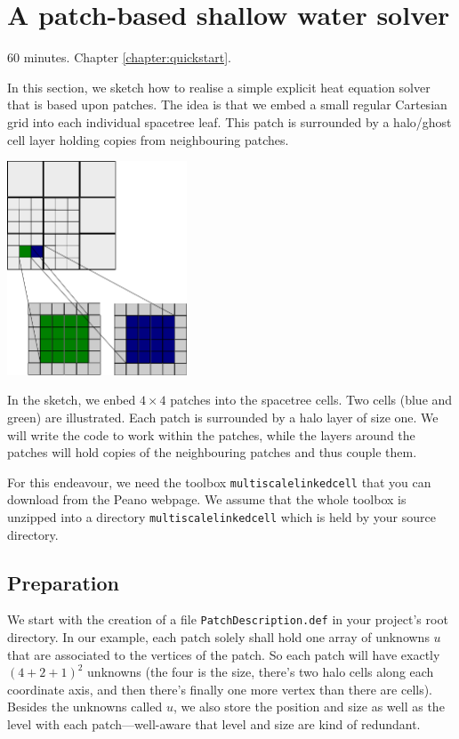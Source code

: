 \section{A patch-based shallow water solver}


\chapterDescription
  {
    60 minutes.
  }
  {
    Chapter \ref{chapter:quickstart}.
  }

In this section, we sketch how to realise a simple explicit heat equation
solver that is based upon patches.
The idea is that we embed a small regular Cartesian grid into each individual
spacetree leaf.
This patch is surrounded by a halo/ghost cell layer holding copies from
neighbouring patches.

\begin{center}
  \includegraphics[width=0.4\textwidth]{22_patch-based-solver/patches.pdf}
\end{center}

In the sketch, we enbed $4\times 4$ patches into the spacetree cells.
Two cells (blue and green) are illustrated.
Each patch is surrounded by a halo layer of size one.
We will write the code to work within the patches, while the layers around the
patches will hold copies of the neighbouring patches and thus couple them.

For this endeavour, we need the toolbox \texttt{multiscalelinkedcell} that you
can download from the Peano webpage.
We assume that the whole toolbox is unzipped into a directory
\texttt{multiscalelinkedcell} which is held by your source directory.


\subsection{Preparation}

We start with the creation of a file \texttt{PatchDescription.def} in your
project's root directory. 
In our example, each patch solely shall hold one array of unknowns $u$ that are
associated to the vertices of the patch.
So each patch will have exactly $(4+2+1)^2$ unknowns (the four is the size,
there's two halo cells along each coordinate axis, and then there's finally one
more vertex than there are cells).
Besides the unknowns called $u$, we also store the position and size as well as
the level with each patch---well-aware that level and size are kind of
redundant.

